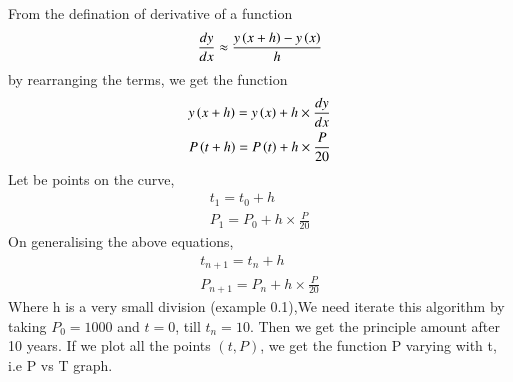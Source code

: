 \documentclass[journal]{IEEEtran}
\begin{document}
From the defination of derivative of a function 
\begin{align}
\frac{dy}{dx} \approx \frac{y\left(x+h\right)-y\left(x\right)}{h} \label{11}
\end{align}
by rearranging the terms, we get the function
\begin{align}
y\left(x+h\right)=y\left(x\right)+h \times \frac{dy}{dx} \\
P\left(t+h\right)=P\left(t\right)+h \times \frac{P}{20}
\end{align}
Let  be points on the curve,
\begin{align}
t_1=t_0+h \\
P_1=P_0+h \times \frac{P}{20}
\end{align}
On  generalising the above equations,
\begin{align}
t_{n+1}=t_{n}+h \\
P_{n+1}=P_{n}+h \times \frac{P}{20} \label{21}
\end{align}
Where h is a very small division (example 0.1),We need iterate this algorithm by taking $P_0=1000$ and $t=0$, till $t_n=10$. Then we get the principle amount after 10 years.
If we plot all the points $(t,P)$, we get the function P varying with t, i.e P vs T graph. \\
\end{document}
